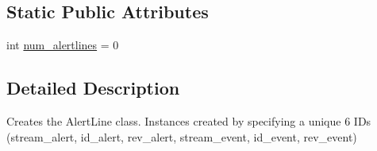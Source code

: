 \subsection*{Static Public Attributes}
\begin{DoxyCompactItemize}
\item 
int \hyperlink{classamonpy_1_1dbase_1_1db__classes_1_1_alert_line_a8450803058ff3da20dc1a9001b77082f}{num\-\_\-alertlines} = 0
\end{DoxyCompactItemize}


\subsection{Detailed Description}
\begin{DoxyVerb}Creates the AlertLine class. Instances created by specifying a unique
    6 IDs (stream_alert, id_alert, rev_alert, stream_event, id_event, rev_event) 
\end{DoxyVerb}
 

